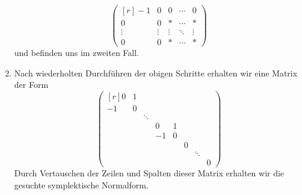 \begin{enumerate}
\[\begin{pmatrix*}[r]
        -1      & 0       & 0       & \cdots  & 0       \\
         0      & 0       & *       & \cdots  & *       \\
         \vdots & \vdots  & \vdots  & \ddots  & \vdots  \\
         0      & 0       & *       & \cdots  & *
      \end{pmatrix*}
    \]
    und befinden uns im zweiten Fall.
  \item
    Nach wiederholten Durchführen der obigen Schritte erhalten wir eine Matrix der Form
    \[
      \begin{pmatrix*}[r]
         0  & 1 &         &     &   &   &         &   \\
        -1  & 0 &         &     &   &   &         &   \\
            &   & \ddots  &     &   &   &         &   \\
            &   &         &  0  & 1 &   &         &   \\
            &   &         & -1  & 0 &   &         &   \\
            &   &         &     &   & 0 &         &   \\
            &   &         &     &   &   & \ddots  &   \\
            &   &         &     &   &   &         & 0
      \end{pmatrix*}
    \]
    Durch Vertauschen der Zeilen und Spalten dieser Matrix erhalten wir die gesuchte symplektische Normalform.
\end{enumerate}




\addtocounter{subsection}{-2}
\subsection{}

